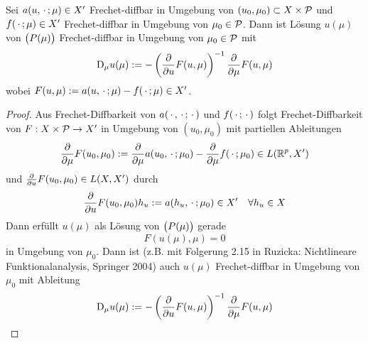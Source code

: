 \begin{satz}[Diffbarkeit]
	Sei $a(u,\,\cdot\,;\mu) \in X'$ Frechet-diffbar in Umgebung von $(u_0,\mu_0) \subset X \times \mathcal{P}$ und $f(\,\cdot\,; \mu) \in X'$ Frechet-diffbar in Umgebung von $\mu_0 \in \mathcal{P}$.
	Dann ist Lösung $u(\mu)$ von $\big(P(\mu)\big)$ Frechet-diffbar in Umgebung von $\mu_0 \in \mathcal{P}$ mit
	\[
		\mathrm{D}_\mu u(\mu) := -\left(\frac{\partial}{\partial {u}} F(u,\mu) \right)^{-1} \frac{\partial}{\partial {\mu}} F(u,\mu)
	\]
	wobei $F(u,\mu) := a(u,\,\cdot\,;\mu) - f(\,\cdot\,;\mu) \in X'$.

	\begin{proof}
		Aus Frechet-Diffbarkeit von $a(\,\cdot\,,\,\cdot\,;\,\cdot\,)$ und $f(\,\cdot\,;\,\cdot\,)$ folgt Frechet-Diffbarkeit von $F : X \times \mathcal{P} \to X'$ in Umgebung von $(u_0,\mu_0)$ mit partiellen Ableitungen
		\[
			\frac{\partial}{\partial {\mu}} F(u_0,\mu_0) := \frac{\partial}{\partial {\mu}} a(u_0,\,\cdot\,;\mu_0) - \frac{\partial}{\partial {\mu}} f(\,\cdot\,;\mu_0) \in L(\mathbb{R}^p,X')
		\]
		und $\frac{\partial}{\partial {u}} F(u_0,\mu_0) \in L(X,X')$ durch
		\[
			\frac{\partial}{\partial {u}} F(u_0,\mu_0) h_u := a(h_u,\,\cdot\,;\mu_0) \in X' \quad \forall h_u \in X
		\]
		Dann erfüllt $u(\mu)$ als Lösung von $\big(P(\mu)\big)$ gerade
		\[
			F(u(\mu),\mu) = 0
		\]
		in Umgebung von $\mu_0$.
		Dann ist (z.B. mit Folgerung 2.15 in Ruzicka: Nichtlineare Funktionalanalysis, Springer 2004) auch $u(\mu)$ Frechet-diffbar in Umgebung von $\mu_0$ mit Ableitung
		\[
			\mathrm{D}_\mu u(\mu) := -\left(\frac{\partial}{\partial {u}} F(u,\mu) \right)^{-1} \frac{\partial}{\partial {\mu}} F(u,\mu)
		\]
	\end{proof}
\end{satz}

